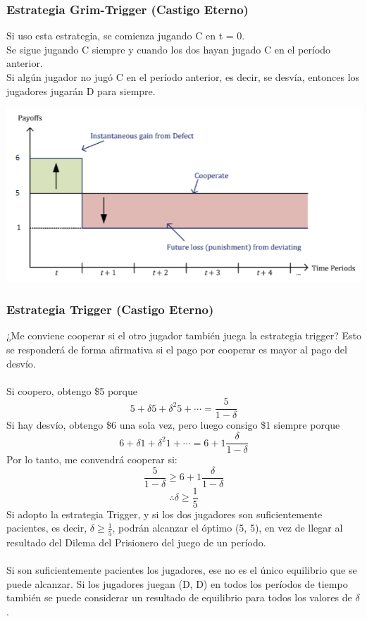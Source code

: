 \documentclass{article}
\begin{document}
        \subsubsection*{Estrategia Grim-Trigger (Castigo Eterno)}
            Si uso esta estrategia, se comienza jugando C en t = 0. \\
            Se sigue jugando C siempre y cuando los dos hayan jugado C en el período anterior. \\
            Si algún jugador no jugó C en el período anterior, es decir, se desvía, entonces los jugadores jugarán D para siempre. \\
            \begin{center}
                \includegraphics[width=0.75 \linewidth]{figs/grim-trigger.png}
            \end{center}
        \subsubsection*{Estrategia Trigger (Castigo Eterno)}
            ¿Me conviene cooperar si el otro jugador también juega la estrategia trigger? Esto se responderá de forma afirmativa si el pago por cooperar es mayor al pago del desvío. \\
            \\
            Si coopero, obtengo \$5 porque \[5 + \delta 5 + \delta^{2}5 + \cdots = \frac{5}{1-\delta}\]
            Si hay desvío, obtengo \$6 una sola vez, pero luego consigo \$1 siempre porque \[6 + \delta 1 + \delta^{2}1 + \cdots = 6 + 1\frac{\delta}{1-\delta}\]
            Por lo tanto, me convendrá cooperar si: \[\frac{5}{1-\delta} \geq 6 + 1\frac{\delta}{1-\delta}\] \[\therefore \delta \geq \frac{1}{5}\]
            Si adopto la estrategia Trigger, y si los dos jugadores son suficientemente pacientes, es decir, \(\delta \geq \frac{1}{5}\), podrán alcanzar el óptimo (5, 5), en vez de llegar al resultado del Dilema del Prisionero del juego de un período. \\
            \\
            Si son suficientemente pacientes los jugadores, ese no es el único equilibrio que se puede alcanzar. Si los jugadores juegan (D, D) en todos los períodos de tiempo también se puede considerar un resultado de equilibrio para todos los valores de $\delta$.
\end{document}
